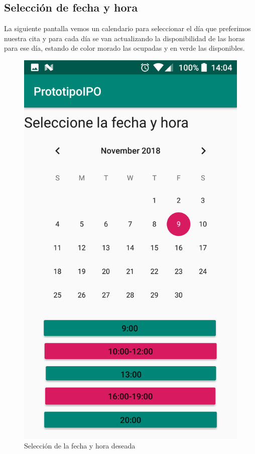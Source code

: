 \documentclass[a4paper,11pt]{article}
\begin{document}
\subsection{Selección de fecha y hora}
La siguiente pantalla vemos un calendario para seleccionar el día que preferimos nuestra cita y para cada día se van actualizando la disponibilidad de las horas para ese día, estando de color morado las ocupadas y en verde las disponibles.
\begin{figure}[H]
  \centering
  \includegraphics[scale=0.2]{10.png}
  \caption{Selección de la fecha y hora deseada}
  \label{fechahora}
\end{figure}
\end{document}
